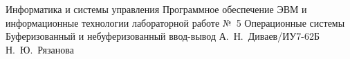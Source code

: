 \documentclass[a4paper,oneside,14pt]{extarticle}
\begin{document}
\makereporttitle
    {Информатика и системы управления} %
    {Программное обеспечение ЭВМ и информационные технологии} %
    {лабораторной работе №~5} %
    {Операционные системы} %
    {Буферизованный и небуферизованный ввод-вывод} %
    {} %
    {А.~Н.~Диваев/ИУ7-62Б} %
    {Н.~Ю.~Рязанова} %

\setcounter{page}{2}





\end{document}
